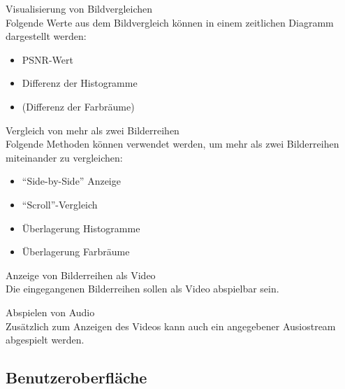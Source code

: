 \begin{speclist}[F]
\spec Visualisierung von Bildvergleichen \\
Folgende Werte aus dem Bildvergleich können in einem zeitlichen Diagramm dargestellt werden:
\begin{itemize}
	\item PSNR-Wert
	\item Differenz der Histogramme
	\item (Differenz der Farbräume)
\end{itemize}

\spec Vergleich von mehr als zwei Bilderreihen \\
Folgende Methoden können verwendet werden, um mehr als zwei Bilderreihen miteinander zu vergleichen:
\begin{itemize}
	\item "`Side-by-Side"' Anzeige
	\item "`Scroll"'-Vergleich
	\item Überlagerung Histogramme
	\item Überlagerung Farbräume
\end{itemize}

\spec Anzeige von Bilderreihen als Video \\
Die eingegangenen Bilderreihen sollen als Video abspielbar sein.

\optspec Abspielen von Audio \\
Zusätzlich zum Anzeigen des Videos kann auch ein angegebener Ausiostream abgespielt werden.

\end{speclist}

\subsection{Benutzeroberfläche}

